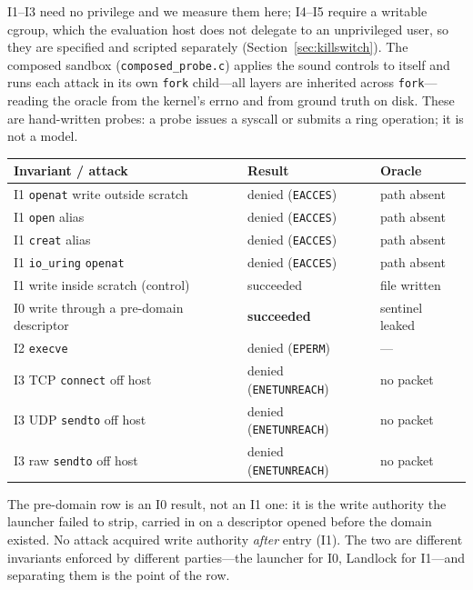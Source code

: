 \documentclass[11pt]{article}
\begin{document}
I1--I3 need no privilege and we measure them here; I4--I5 require a writable cgroup, which the evaluation
host does not delegate to an unprivileged user, so they are specified and scripted separately
(Section~\ref{sec:killswitch}). The composed sandbox (\texttt{composed\_probe.c}) applies the sound
controls to itself and runs each attack in its own \texttt{fork} child---all layers are inherited across
\texttt{fork}---reading the oracle from the kernel's errno and from ground truth on disk. These are
hand-written probes: a probe issues a syscall or submits a ring operation; it is not a model.

\begin{center}
\begin{tabular}{lll}
\toprule
Invariant / attack & Result & Oracle \\
\midrule
I1 \texttt{openat} write outside scratch    & denied (\texttt{EACCES})     & path absent \\
I1 \texttt{open} alias                       & denied (\texttt{EACCES})     & path absent \\
I1 \texttt{creat} alias                      & denied (\texttt{EACCES})     & path absent \\
I1 \texttt{io\_uring} \texttt{openat}        & denied (\texttt{EACCES})     & path absent \\
I1 write inside scratch (control)            & succeeded                    & file written \\
I0 write through a pre-domain descriptor     & \textbf{succeeded}           & sentinel leaked \\
I2 \texttt{execve}                           & denied (\texttt{EPERM})      & --- \\
I3 TCP \texttt{connect} off host             & denied (\texttt{ENETUNREACH})& no packet \\
I3 UDP \texttt{sendto} off host              & denied (\texttt{ENETUNREACH})& no packet \\
I3 raw \texttt{sendto} off host              & denied (\texttt{ENETUNREACH})& no packet \\
\bottomrule
\end{tabular}
\end{center}

The pre-domain row is an I0 result, not an I1 one: it is the write authority the launcher failed to
strip, carried in on a descriptor opened before the domain existed. No attack acquired write authority
\emph{after} entry (I1). The two are different invariants enforced by different parties---the launcher for
I0, Landlock for I1---and separating them is the point of the row.
\end{document}
